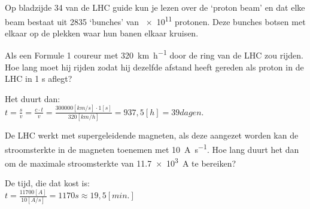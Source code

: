 \begin{questions}
\question
Op bladzijde 34 van de LHC guide kun je lezen over de `proton beam' en dat elke beam bestaat
uit 2835 `bunches' van \SI{e11}{} protonen. Deze bunches botsen met elkaar op de plekken waar 
hun banen elkaar kruisen.

\question 
Als een Formule 1 coureur met \SI{320}{\kilo\meter\per\hour} door de ring van de 
LHC zou rijden. Hoe lang moet hij rijden zodat hij dezelfde afstand heeft gereden als
proton in de LHC in 1 s aflegt?

\begin{solution}
Het duurt dan: \\
$t = \frac{s}{v} = \frac{c\cdot t}{v} = \frac{ 300000 [km/s] \cdot 1 [s]}{320 [km/h]} = 937,5 [h] = 39 dagen.$
\end{solution}

\question
De LHC werkt met supergeleidende magneten, als deze aangezet worden kan de stroomsterkte
in de magneten toenemen met \SI{10}{\ampere\per\second}. Hoe lang duurt het dan om
de maximale stroomsterkte van \SI{11,7e3}{\ampere} te bereiken?

\begin{solution}
De tijd, die dat kost is: \\
$t = \frac{11700 [A]}{10 [A/s]} = 1170 s \approx 19,5 [min.]$
\end{solution}


\end{questions}
